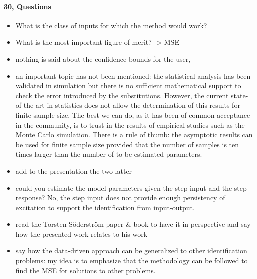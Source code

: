 \documentclass[12pt,english]{article}
\begin{document}
\paragraph{30, Questions}
\begin{itemize}
	\item What is the class of inputs for which the method would work?
	\item What is the most important figure of merit? -> MSE
	\item nothing is said about the confidence bounds for the user,
	\item an important topic has not been mentioned: the statistical analysis has been validated in simulation but there is no sufficient mathematical support to check the error introduced by the substitutions. However, the current state-of-the-art in statistics does not allow the determination of this results for finite sample size. The best we can do, as it has been of common acceptance in the community, is to trust in the results of empirical studies such as the Monte Carlo simulation. There is a rule of thumb: the asymptotic results can be used for finite sample size provided that the number of samples is ten times larger than the number of to-be-estimated parameters.
	\item add to the presentation the two latter 
	\item could you estimate the model parameters given the step input and the step response? No, the step input does not provide enough persistency of excitation to support the identification from input-output.
	\item read the Torsten S\"oderstr\"om paper \& book to have it in perspective and say how the presented work relates to his work  
	\item say how the data-driven approach can be generalized to other identification problems: my idea is to emphasize that the methodology can be followed to find the MSE for solutions to other problems.    

\end{itemize}
\end{document}
